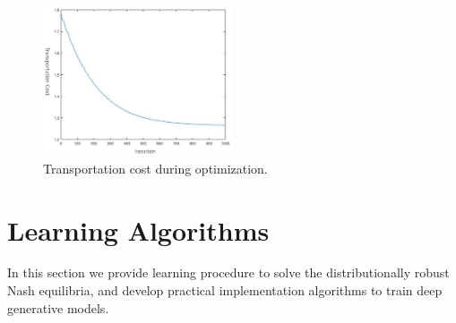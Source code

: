\documentclass{article}
\begin{document}
\begin{figure}[htb!]
\centering
\includegraphics[width=0.5\textwidth]{FIGDRG/Jw}
\caption{{\color{blue} Transportation cost during optimization.}}
\label{fig:cost}
\end{figure}


\newpage



\section{Learning Algorithms}
\label{Sec:Learning}

In this section we provide learning procedure to solve the distributionally robust Nash equilibria, and develop practical implementation algorithms to train deep generative models.

\end{document}
